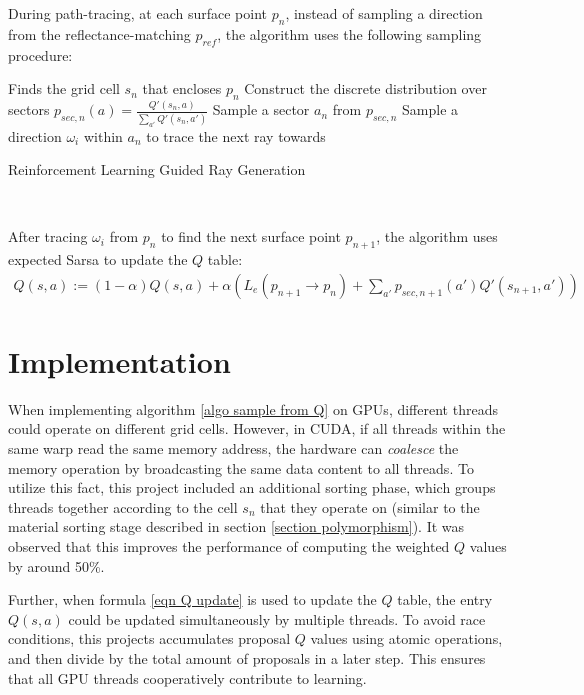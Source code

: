 During path-tracing, at each surface point $p_n$, instead of sampling a direction from the reflectance-matching $p_{ref}$, the algorithm uses the following sampling procedure:

\begin{algorithm}[H]
    \label{algo sample from Q}
    Finds the grid cell $s_n$ that encloses $p_n$\;
    Construct the discrete distribution over sectors $p_{sec,n}(a)=\frac{Q'(s_n,a)}{\sum_{a'}Q'(s_n,a')}$\;
    Sample a sector $a_n$ from $p_{sec,n}$\;
    Sample a direction $\omega_i$ within $a_n$ to trace the next ray towards\;
    \caption{Reinforcement Learning Guided Ray Generation}
\end{algorithm} 

~

After tracing $\omega_i$ from $p_n$ to find the next surface point $p_{n+1}$, the algorithm uses expected Sarsa to update the $Q$ table:
\begin{align}
    \label{eqn Q update}
    Q(s,a) := (1-\alpha) Q(s,a) + \alpha  \left(L_e(p_{n+1}\to p_n)+ \sum_{a'} p_{sec,n+1}(a')  Q'(s_{n+1},a')\right)
\end{align}

\section{Implementation}
When implementing algorithm \ref{algo sample from Q} on GPUs, different threads could operate on different grid cells. However, in CUDA, if all threads within the same warp read the same memory address, the hardware can \textit{coalesce} the memory operation by broadcasting the same data content to all threads. To utilize this fact, this project included an additional sorting phase, which groups threads together according to the cell $s_n$ that they operate on (similar to the material sorting stage described in section \ref{section polymorphism}). It was observed that this improves the performance of computing the weighted $Q$ values by around 50\%.

Further, when formula \ref{eqn Q update} is used to update the $Q$ table, the entry $Q(s,a)$ could be updated simultaneously by multiple threads. To avoid race conditions, this projects accumulates proposal $Q$ values using atomic operations, and then divide by the total amount of proposals in a later step. This ensures that all GPU threads cooperatively contribute to learning. 

